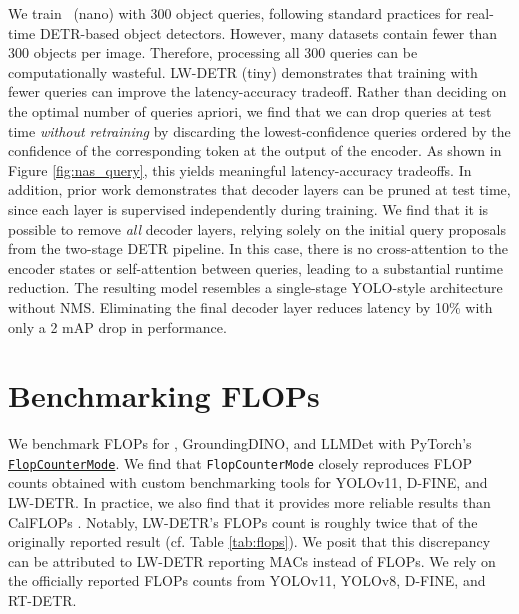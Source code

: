 We train \method \ (nano) with 300 object queries, following standard practices for real-time DETR-based object detectors. However, many datasets contain fewer than 300 objects per image. Therefore, processing all 300 queries can be computationally wasteful. LW-DETR (tiny) demonstrates that training with fewer queries can improve the latency-accuracy tradeoff. Rather than deciding on the optimal number of queries apriori, we find that we can drop queries at test time \textit{without retraining} by discarding the lowest-confidence queries ordered by the confidence of the corresponding token at the output of the encoder. As shown in Figure \ref{fig:nas_query}, this yields meaningful latency-accuracy tradeoffs. In addition, prior work \citep{zhao2024rtdetr} demonstrates that decoder layers can be pruned at test time, since each layer is supervised independently during training. We find that it is possible to remove \emph{all} decoder layers, relying solely on the initial query proposals from the two-stage DETR pipeline. In this case, there is no cross-attention to the encoder states or self-attention between queries, leading to a substantial runtime reduction. The resulting model resembles a single-stage YOLO-style architecture without NMS. Eliminating the final decoder layer reduces latency by 10\% with only a 2 mAP drop in performance.


\section{Benchmarking FLOPs}
We benchmark FLOPs for \method, GroundingDINO, and LLMDet with PyTorch's \href{https://github.com/pytorch/pytorch/blob/baee623691a38433d10843d5bb9bc0ef6a0feeef/torch/utils/flop_counter.py#L596}{\texttt{FlopCounterMode}}. We find that \texttt{FlopCounterMode} closely reproduces FLOP counts obtained with custom benchmarking tools for YOLOv11, D-FINE, and LW-DETR. In practice, we also find that it provides more reliable results than CalFLOPs \citep{calflops}. Notably, LW-DETR's FLOPs count is roughly twice that of the originally reported result (cf. Table \ref{tab:flops}). We posit that this discrepancy can be attributed to LW-DETR reporting MACs instead of FLOPs. We rely on the officially reported FLOPs counts from YOLOv11, YOLOv8, D-FINE, and RT-DETR.


